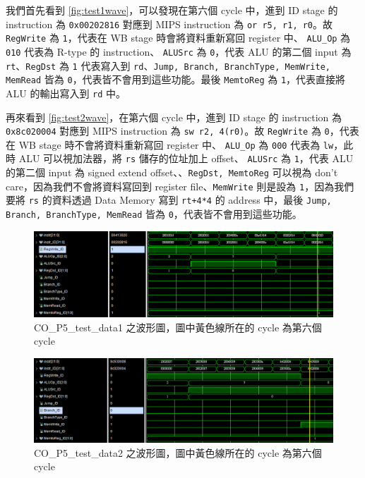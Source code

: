 \documentclass[twocolumn]{extarticle}
\begin{document}
我們首先看到 \autoref{fig:test1wave}，可以發現在第六個 cycle 中，進到 ID stage 的 instruction 為 \texttt{0x00202816} 對應到 MIPS instruction 為 \texttt{or r5, r1, r0}。故 \texttt{RegWrite} 為 \texttt{1}，代表在 WB stage 時會將資料重新寫回 register 中、 \texttt{ALU\_Op} 為 \texttt{010} 代表為 R-type 的 instruction、 \texttt{ALUSrc} 為 \texttt{0}，代表 ALU 的第二個 input 為 \texttt{rt}、\texttt{RegDst} 為 \texttt{1} 代表寫入到 \texttt{rd}、\texttt{Jump, Branch, BranchType, MemWrite, MemRead} 皆為 \texttt{0}，代表皆不會用到這些功能。最後 \texttt{MemtoReg} 為 \texttt{1}，代表直接將 ALU 的輸出寫入到 \texttt{rd} 中。

再來看到 \autoref{fig:test2wave}，在第六個 cycle 中，進到 ID stage 的 instruction 為 \texttt{0x8c020004} 對應到 MIPS instruction 為 \texttt{sw r2, 4(r0)}。故 \texttt{RegWrite} 為 \texttt{0}，代表在 WB stage 時不會將資料重新寫回 register 中、 \texttt{ALU\_Op} 為 \texttt{000} 代表為 \texttt{lw}，此時 ALU 可以視加法器，將 \texttt{rs} 儲存的位址加上 offset、 \texttt{ALUSrc} 為 \texttt{1}，代表 ALU 的第二個 input 為 signed extend offset、、\texttt{RegDst, MemtoReg} 可以視為 don't care，因為我們不會將資料寫回到 register file、\texttt{MemWrite} 則是設為 \texttt{1}，因為我們要將 \texttt{rs} 的資料透過 Data Memory 寫到 \texttt{rt+4*4} 的 address 中，最後 \texttt{Jump, Branch, BranchType, MemRead} 皆為 \texttt{0}，代表皆不會用到這些功能。


\begin{figure}[H]
\centering
\includegraphics[width=\linewidth]{test1_wave}
\caption{CO\_P5\_test\_data1 之波形圖，圖中黃色線所在的 cycle 為第六個 cycle}
\label{fig:test1wave}
\end{figure}

\begin{figure}[H]
\centering
\includegraphics[width=\linewidth]{test2_wave}
\caption{CO\_P5\_test\_data2 之波形圖，圖中黃色線所在的 cycle 為第六個 cycle}
\label{fig:test2wave}
\end{figure}
\end{document}
